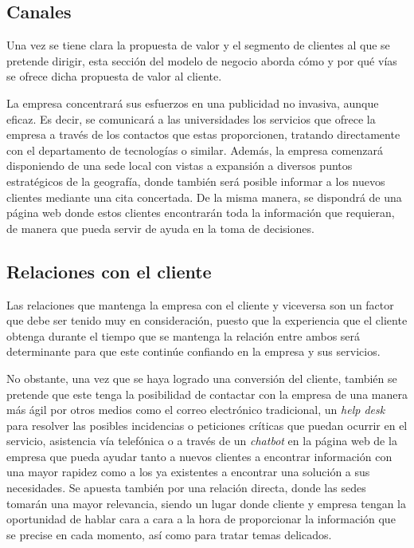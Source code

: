 \subsection{Canales}
Una vez se tiene clara la propuesta de valor y el segmento de clientes al que se pretende dirigir, esta sección del modelo de negocio aborda cómo y por qué vías se ofrece dicha propuesta de valor al cliente.

La empresa concentrará sus esfuerzos en una publicidad no invasiva, aunque eficaz. Es decir, se comunicará a las universidades los servicios que ofrece la empresa a través de los contactos que estas proporcionen, tratando directamente con el departamento de tecnologías o similar. Además, la empresa comenzará disponiendo de una sede local con vistas a expansión a diversos puntos estratégicos de la geografía, donde también será posible informar a los nuevos clientes mediante una cita concertada. De la misma manera, se dispondrá de una página web donde estos clientes encontrarán toda la información que requieran, de manera que pueda servir de ayuda en la toma de decisiones.

\subsection{Relaciones con el cliente}
Las relaciones que mantenga la empresa con el cliente y viceversa son un factor que debe ser tenido muy en consideración, puesto que la experiencia que el cliente obtenga durante el tiempo que se mantenga la relación entre ambos será determinante para que este continúe confiando en la empresa y sus servicios.

No obstante, una vez que se haya logrado una conversión del cliente, también se pretende que este tenga la posibilidad de contactar con la empresa de una manera más ágil por otros medios como el correo electrónico tradicional, un \textit{help desk} para resolver las posibles incidencias o peticiones críticas que puedan ocurrir en el servicio, asistencia vía telefónica o a través de un \textit{chatbot} en la página web de la empresa que pueda ayudar tanto a nuevos clientes a encontrar información con una mayor rapidez como a los ya existentes a encontrar una solución a sus necesidades. Se apuesta también por una relación directa, donde las sedes tomarán una mayor relevancia, siendo un lugar donde cliente y empresa tengan la oportunidad de hablar cara a cara a la hora de proporcionar la información que se precise en cada momento, así como para tratar temas delicados.

